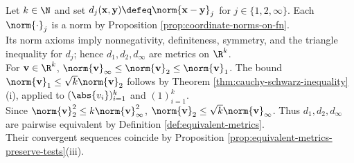 \begin{example} \label{ex:coordinate-norm-metrics-rk} \\
Let $k\in\N$ and set $d_j(\mathbf{x},\mathbf{y})\defeq\norm{\mathbf{x}-\mathbf{y}}_j$ for $j\in\{1,2,\infty\}$. Each $\norm{\cdot}_j$ is a norm by Proposition \ref{prop:coordinate-norms-on-fn}.\\
Its norm axioms imply nonnegativity, definiteness, symmetry, and the triangle inequality for $d_j$; hence $d_1,d_2,d_\infty$ are metrics on $\R^k$.\\
For $\mathbf{v}\in\R^k$, $\norm{\mathbf{v}}_\infty\leq\norm{\mathbf{v}}_2\leq\norm{\mathbf{v}}_1$. The bound $\norm{\mathbf{v}}_1\leq\sqrt{k}\norm{\mathbf{v}}_2$ follows by Theorem \ref{thm:cauchy-schwarz-inequality}(i), applied to $(\abs{v_i})_{i=1}^k$ and $(1)_{i=1}^k$.\\
Since $\norm{\mathbf{v}}_2^2\leq k\norm{\mathbf{v}}_\infty^2$, $\norm{\mathbf{v}}_2\leq\sqrt{k}\norm{\mathbf{v}}_\infty$. Thus $d_1,d_2,d_\infty$ are pairwise equivalent by Definition \ref{def:equivalent-metrics}.\\
Their convergent sequences coincide by Proposition \ref{prop:equivalent-metrics-preserve-tests}(iii).
\end{example}


